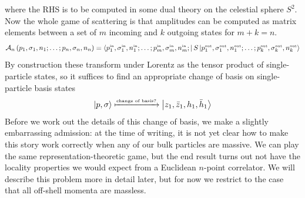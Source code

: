 \documentclass[11pt,letterpaper]{article}
\newcommand{\LP}{\left(}
\newcommand{\RP}{\right)}
\newcommand{\mc}[1]{\mathcal{#1}}
\newcommand{\KET}[1]{\left| #1 \right\rangle }
\newcommand{\BRA}[1]{\left\langle #1 \right| }
\begin{document}
where the RHS is to be computed in some dual theory on the celestial sphere $S^2$. Now the whole game of scattering is that amplitudes can be computed as matrix elements between a set of $m$ incoming and $k$ outgoing states for $m + k = n$. \begin{equation}
\mc{A}_n \LP p_1, \sigma_1, n_1; \ldots; p_n, \sigma_n, n_n \RP = \BRA{p^{\mbox{\tiny{in}}}_1, \sigma^{\mbox{\tiny{in}}}_1, n^{\mbox{\tiny{in}}}_1; \ldots; p^{\mbox{\tiny{in}}}_m, \sigma^{\mbox{\tiny{in}}}_m, n^{\mbox{\tiny{in}}}_m; } S \KET{p^{\mbox{\tiny{out}}}_1, \sigma^{\mbox{\tiny{out}}}_1, n^{\mbox{\tiny{out}}}_1; \ldots; p^{\mbox{\tiny{out}}}_k, \sigma^{\mbox{\tiny{out}}}_k, n^{\mbox{\tiny{out}}}_k }
\end{equation}
By construction these transform under Lorentz as the tensor product of single-particle states, so it suffices to find an appropriate change of basis on single-particle basis states \begin{equation}
\KET{p, \sigma} \xmapsto{\mbox{\tiny{change of basis?}}} \KET{z_1, \bar{z}_1, h_1, \bar{h}_1}
\end{equation}
Before we work out the details of this change of basis, we make a slightly embarrassing admission: at the time of writing, it is not yet clear how to make this story work correctly when any of our bulk particles are massive. We can play the same representation-theoretic game, but the end result turns out not have the locality properties we would expect from a Euclidean $n$-point correlator. We will describe this problem more in detail later, but for now we restrict to the case that all off-shell momenta are massless. 
\end{document}
